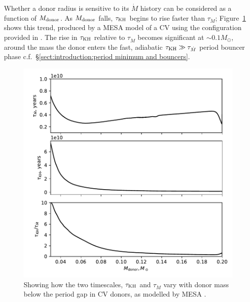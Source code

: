 Whether a donor radius is sensitive to its $\dot M$ history can be considered as a function of $M_{\rm donor}$. As $M_{\rm donor}$ falls, $\tau_{\rm KH}$ begins to rise faster than $\tau_{\dot M}$; Figure~\ref{fig:results:how does tauKH and tauMdot vary with donor mass} shows this trend, produced by a MESA model of a CV using the configuration provided in \citet{Paxton_2015}.
The rise in $\tau_{\rm KH}$ relative to $\tau_{\dot M}$ becomes significant at $\sim 0.1 M_\odot$, around the mass the donor enters the fast, adiabatic $\tau_{\rm KH} \gg \tau_{\dot M}$ period bouncer phase c.f.~\S\ref{sect:introduction:period minimum and bouncers}.
\begin{figure}
    \centering
    \includegraphics[width=\textwidth]{figures/modelling/tau_both_vs_donor_mass_AML000.pdf}
    \caption{Showing how the two timescales, $\tau_{\rm KH}$ and $\tau_{\dot M}$ vary with donor mass below the period gap in CV donors, as modelled by MESA \citep{Paxton_2015,Pala2017a}.}
    \label{fig:results:how does tauKH and tauMdot vary with donor mass}
\end{figure}

